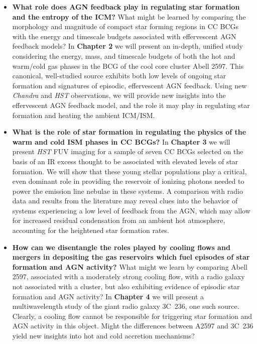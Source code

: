 
\begin{itemize}


\item  {\bf What role does AGN feedback play in regulating star formation and 
the entropy of the ICM?} 
What might be learned by comparing the morphology and magnitude
of compact star forming regions in CC BCGs with the energy and timescale 
budgets associated with effervescent AGN feedback models? 
In {\bf Chapter 2} we will present 
an in-depth, unified study 
considering the energy, mass, 
and timescale budgets of both the hot and warm/cold gas phases
in the BCG of the cool core cluster Abell 2597. This canonical, well-studied
source exhibits both low levels of ongoing star formation and 
signatures of episodic, effervescent AGN feedback. 
Using new {\it Chandra} and {\it HST} observations, we will provide 
new insights into the effervescent AGN feedback model, and the role 
it may play in regulating star formation and heating the ambient ICM/ISM. 


\item {\bf What is the role of star formation in 
regulating the physics of the warm and cold ISM phases in CC BCGs?}
In {\bf Chapter 3} we will present {\it HST} FUV imaging for a sample of 
seven CC BCGs selected on the basis of an IR excess thought to be associated 
with elevated levels of star formation. We will show that these young 
stellar populations play a critical, even dominant role in 
providing the reservoir of ionizing photons needed to power the 
emission line nebulae in these systems. A comparison with radio data 
and results from the literature may reveal clues into the behavior of systems
experiencing a low level of feedback from the AGN, which may allow for
increased residual condensation from an ambient hot atmosphere, accounting 
for the heightened star formation rates. 


\item {\bf How can we disentangle the roles played by cooling flows and 
mergers in depositing the gas reservoirs which fuel episodes of star 
formation and AGN activity?} What might we learn by comparing 
Abell 2597, associated with a moderately strong cooling flow, with 
a radio galaxy not associated with a cluster, but also exhibiting 
evidence of episodic star formation and AGN activity? 
In {\bf Chapter 4} we will present a multiwavelength study of the giant 
radio galaxy 3C~236, one such source. Clearly, a cooling flow 
cannot be responsible for triggering star formation and AGN activity in this object. Might the differences between A2597 and 3C~236 yield new insights into 
hot and cold accretion mechanisms?  



\end{itemize}
